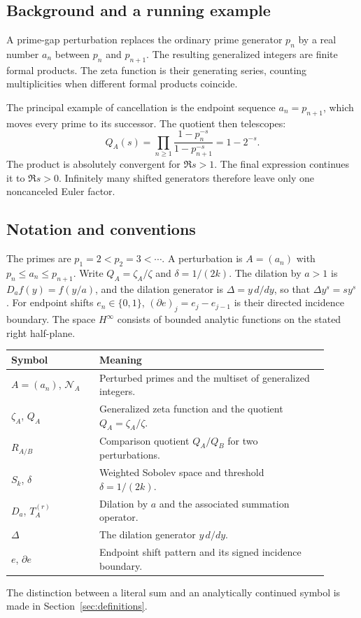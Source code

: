\documentclass[12pt,letterpaper]{article}
\numberwithin{equation}{section}
\theoremstyle{remark}
\begin{document}
\subsection{Background and a running example}
A prime-gap perturbation replaces the ordinary prime generator
\(p_n\) by a real number \(a_n\) between \(p_n\) and \(p_{n+1}\).
The resulting generalized integers are finite formal products.
The zeta function is their generating series, counting
multiplicities when different formal products coincide.

The principal example of cancellation is the endpoint sequence
\(a_n=p_{n+1}\), which moves every prime to its successor.
The quotient then telescopes:
\begin{equation}\label{eq:intro-telescope}
  Q_A(s)=\prod_{n\ge1}
  \frac{1-p_n^{-s}}{1-p_{n+1}^{-s}}
  =1-2^{-s}.
\end{equation}
The product is absolutely convergent for \(\Re s>1\).
The final expression continues it to \(\Re s>0\).
Infinitely many shifted generators therefore leave only one
noncanceled Euler factor.

\subsection{Notation and conventions}
The primes are $p_1=2<p_2=3<\cdots$.
A perturbation is $A=(a_n)$ with $p_n\le a_n\le p_{n+1}$.
Write $Q_A=\zeta_A/\zeta$ and $\delta=1/(2k)$.
The dilation by $a>1$ is $D_af(y)=f(y/a)$, and the dilation
generator is $\Delta=y\,d/dy$, so that $\Delta y^s=sy^s$.
For endpoint shifts $e_n\in\{0,1\}$,
$(\partial e)_j=e_j-e_{j-1}$ is their directed incidence boundary.
The space $H^\infty$ consists of bounded analytic functions
on the stated right half-plane.

\begin{center}
\begin{tabular}{@{}p{0.25\linewidth}p{0.65\linewidth}@{}}
\toprule
Symbol & Meaning\\
\midrule
\(A=(a_n)\), \(\mathcal N_A\) & Perturbed primes and
the multiset of generalized integers.\\
\(\zeta_A\), \(Q_A\) & Generalized zeta function
and the quotient \(Q_A=\zeta_A/\zeta\).\\
\(R_{A/B}\) & Comparison quotient \(Q_A/Q_B\)
for two perturbations.\\
\(S_k\), \(\delta\) & Weighted Sobolev space and
threshold \(\delta=1/(2k)\).\\
\(D_a\), \(T_A^{(r)}\) & Dilation by \(a\)
and the associated summation operator.\\
\(\Delta\) & The dilation generator \(y\,d/dy\).\\
\(e\), \(\partial e\) & Endpoint shift pattern
and its signed incidence boundary.\\
\bottomrule
\end{tabular}
\end{center}
The distinction between a literal sum and an
analytically continued symbol is made in
Section~\ref{sec:definitions}.
\end{document}
